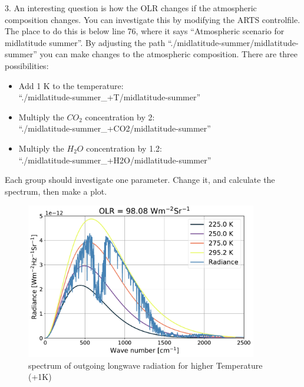 \documentclass[paper=a4, fontsize=11pt]{scrartcl} %
\begin{document}
3. An interesting question is how the OLR changes if the atmospheric composition changes. 
You can investigate this by modifying the ARTS controlfile. The place to do this 
is below line 76, where it says “Atmospheric scenario for midlatitude summer”. 
By adjusting the path ``./midlatitude-summer/midlatitude-summer'' 
you can make changes to the atmospheric composition. There are three possibilities:
\begin{itemize}
    \item Add 1 K to the temperature: \\ ``./midlatitude-summer\_+T/midlatitude-summer''
    \item Multiply the $CO_{2}$ concentration by 2: \\ ``./midlatitude-summer\_+CO2/midlatitude-summer''
    \item Multiply the $H_{2}O$ concentration by 1.2: \\ ``./midlatitude-summer\_+H2O/midlatitude-summer'' \ \\
\end{itemize}

Each group should investigate one parameter. Change it, and calculate the spectrum, then make a plot. 

\begin{figure}[h]
\centering
    \includegraphics[width=0.9\textwidth]{plots/olr_+T.pdf}
    \caption{spectrum of outgoing longwave radiation for higher Temperature (+1K)}
\end{figure}
\end{document}
